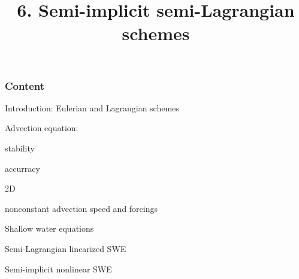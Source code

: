 \documentclass[aspectratio=43,9pt]{beamer}
\title{6. Semi-implicit semi-Lagrangian schemes}%
\begin{document}
%
%
\begin{frame}[plain]
	\titlepage
\end{frame}
%
%
\begin{frame}
	\frametitle{Content}
	\begin{myitemize}{2ex}
		\item Introduction: Eulerian and Lagrangian schemes
		\item Advection equation:
			\begin{myitemize}{1ex}
				\item stability
				\item accurracy
				\item 2D
				\item nonconstant advection speed and forcings
			\end{myitemize}
		\item Shallow water equations
			\begin{myitemize}{1ex}
				\item Semi-Lagrangian linearized SWE
				\item Semi-implicit nonlinear SWE
			\end{myitemize}
	\end{myitemize}
\end{frame}
%
%
\end{document}
